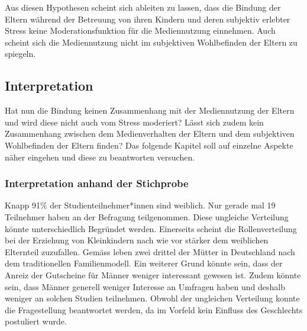 Aus diesen Hypothesen scheint sich ableiten zu lassen, dass die Bindung der Eltern während der Betreuung von ihren Kindern und deren subjektiv erlebter Stress keine Moderationsfunktion für die Mediennutzung  einnehmen. Auch scheint sich die Mediennutzung nicht im subjektiven Wohlbefinden der Eltern zu spiegeln.

\subsection{Interpretation} \label{sec:Interpretation}
Hat nun die Bindung keinen Zusammenhang mit der Mediennutzung der Eltern und wird diese nicht auch vom Stress moderiert? Lässt sich zudem kein Zusammenhang zwischen dem Medienverhalten der Eltern und dem subjektiven Wohlbefinden der Eltern finden? Das folgende Kapitel soll auf einzelne Aspekte näher eingehen und diese zu beantworten versuchen.

\subsubsection{Interpretation anhand der Stichprobe}\label{sec:InterpretationStichprobe}
Knapp 91\% der Studienteilnehmer*innen sind weiblich. Nur gerade mal 19 Teilnehmer haben an der Befragung teilgenommen. Diese ungleiche Verteilung könnte unterschiedlich Begründet werden. Einerseits scheint die Rollenverteilung bei der Erziehung von Kleinkindern nach wie vor stärker dem weiblichen Elternteil zuzufallen. Gemäss  leben zwei drittel der Mütter in Deutschland nach dem traditionellen Familienmodell. Ein weiterer Grund könnte sein, dass der Anreiz der Gutscheine für Männer weniger interessant gewesen ist. Zudem könnte sein, dass Männer generell weniger Interesse an Umfragen haben und deshalb weniger an solchen Studien teilnehmen. Obwohl der ungleichen Verteilung konnte die Fragestellung beantwortet werden, da im Vorfeld kein Einfluss des Geschlechts postuliert wurde.

